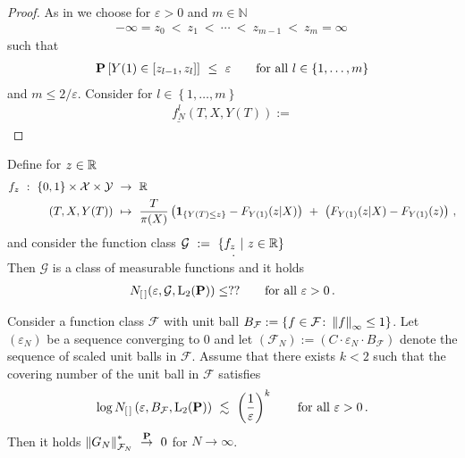 \begin{proof}
  As in \cite[Example~19.6]{Vaart2000}
  we choose for
  $\varepsilon>0$ and $m\in\mathbb{N}$
  \begin{gather}
  -\infty=z_0\ <\ z_1\ <\ \cdots\ <\ z_{m-1}\ <\ z_m=\infty
  \,
  \end{gather}
  such that
  \begin{gather}
    \P
    \left[ 
      Y(1)\in \left[ z_{l-1},z_l \right]
    \right]
    \ 
    \le
    \ 
    \varepsilon
    \qquad
    \text{for all}\ 
    l\in \left\{ 1,\ldots,m \right\}
  \end{gather}
  and $m \le 2/\varepsilon$.
  Consider for
$
    l\in \left\{ 1,\ldots,m \right\}
$
\begin{align}
  \underline{f_N^l}
  (T,X,Y(T))
  :=
\end{align}
\end{proof}
\begin{lemma}
  Define for
  $z\in\mathbb{R}$
 \begin{align*}
    f_z
    \ 
    :
    \ 
      \left\{ 0,1 \right\}
      \times
      \mathcal{X}
      \times
      \mathcal{Y}
&
    \ 
    \to
    \ 
      \R
    \\
    \left(
      T,X,Y(T)
    \right)
    &
      \ 
      \mapsto
      \ 
      \frac{T}{\pi(X)}
      \left( 
        \mathbf{1}
        _{\left\{ Y(T)\le z \right\}}
        -
        F_{Y(1)}(z|X)
      \right)
      \ 
      +
      \ 
      \left( 
        F_{Y(1)}(z|X)
        -
        F_{Y(1)}(z)
      \right)
      \,,
  \end{align*}
and consider the function class
$
  \mathcal{G}
  \ 
  :=
  \ 
  \left\{ 
    f_z
  \ 
    |
  \ 
    z\in\R
  \right\}
$
\begin{gather}
    \,.
\end{gather}
  Then $\mathcal{G}$ is a class of measurable functions 
  and it holds
  \begin{gather}
    N_{[\,]}(\varepsilon,\mathcal{G},\mathrm{L}_2(\P))
    \le
    ??
    \qquad
    \text{for all}
    \ 
    \varepsilon>0
    \,.
  \end{gather}
\end{lemma}
\begin{lemma}
  \label{lemma_max_ineq}
  Consider a function class $\mathcal{F}$ with unit ball
  $
  B_{\mathcal{F}}
  :=
  \left\{ 
    f\in \mathcal{F}
    \colon
    \left\lVert f\right\rVert_\infty
    \le
    1
  \right\}
  $.
  Let $(\varepsilon_N)$ be a sequence converging to 0
  and let 
  $
  \left( 
    \mathcal{F}_N
  \right)
    :=
    \left( 
      C\cdot
    \varepsilon_N\cdot B_\mathcal{F}
    \right)
  $
  denote the sequence of scaled unit balls in $\mathcal{F}$.
  Assume that 
  there exists
  $k<2$ such that 
  the covering number of the unit ball in $\mathcal{F}$
  satisfies
  \begin{gather}
        \log 
      N_{[\,]}
\left( \varepsilon, B_\mathcal{F},\mathrm{L}_2(\P) \right)
\ 
\lesssim
\ 
\left( \frac{1}{\varepsilon} \right)^k
\qquad
\text{for all}\ 
\varepsilon>0
\,.
  \end{gather}
  Then it holds
  $
      \norm{G_N}^*_{\mathcal{F}_N}
    \ 
    \overset{\P}
    {\to}
    \ 
    0
  $
  for $N\to \infty$. 
\end{lemma}
